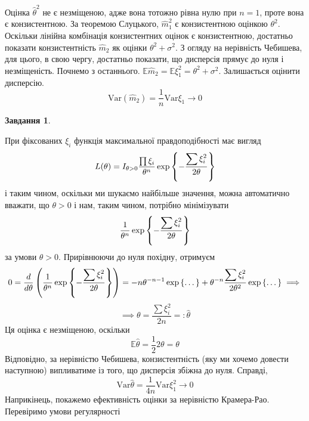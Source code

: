 \documentclass[12pt]{article} %
\newtheorem{prob}{Завдання}
\newcommand{\Var}{\mbox{Var}}
\begin{document}
	Оцінка $\hat{\theta}^2$ не є незміщеною, адже вона тотожно рівна нулю при $n=1$, проте вона є конзистентною. За теоремою Слуцького,
	$\hat{m}_1^2$ є конзистентною оцінкою $\theta^2$. Оскільки лінійна комбінація конзистентних оцінок є конзистентною, достатньо показати
	конзистентність $\hat{m}_2$ як оцінки $\theta^2+\sigma^2$. З огляду на нерівність Чебишева, для цього, в свою чергу, достатньо показати,
	що дисперсія прямує до нуля і незміщеність. Почнемо з останнього. $\mathbb{E}\hat{m}_2=\mathbb{E}\xi_1^2=\theta^2+\sigma^2$.
	Залишається оцінити дисперсію. 
	\[\Var(\hat{m}_2)=\frac{1}{n}\Var\xi_1\to0\]
	\begin{prob}\end{prob}
	При фіксованих $\xi_i$ функція максимальної правдоподібності має вигляд
	\[L(\theta)=I_{\theta>0}\frac{\prod{\xi_i}}{\theta^n}\exp\mycbra{-\frac{\sum\xi_i^2}{2\theta}}\]
	і таким чином, оскільки ми шукаємо найбільше значення, можна автоматично вважати, що $\theta>0$ і нам,
	таким чином, потрібно мінімізувати
	\[\frac{1}{\theta^n}\exp\mycbra{-\frac{\sum\xi_i^2}{2\theta}}\]
	за умови $\theta>0$. Прирівнюючи до нуля похідну, отримуєм
	\[0=\frac{d}{d\theta}\mybra{\frac{1}{\theta^n}\exp\mycbra{-\frac{\sum\xi_i^2}{2\theta}}}=-n\theta^{-n-1}\exp\mycbra{\dots}+\theta^{-n}
	\frac{\sum\xi_i^2}{2\theta^2}\exp\mycbra{\dots}\implies\]
	\[\implies\theta=\frac{\sum\xi_i^2}{2n}=:\hat{\theta}\]
	Ця оцінка є незміщеною, оскільки
	\[\mathbb{E}\hat{\theta}=\frac{1}{2}2\theta=\theta\]
	Відповідно, за нерівністю Чебишева, конзистентність (яку ми хочемо довести наступною) випливатиме із того, що дисперсія збіжна до нуля.
	Справді,
	\[\Var\hat{\theta}=\frac{1}{4n}\Var\xi_1^2\to0\]
	Наприкінець, покажемо ефективність оцінки за нерівністю Крамера-Рао. Перевіримо умови регулярності
\end{document}
